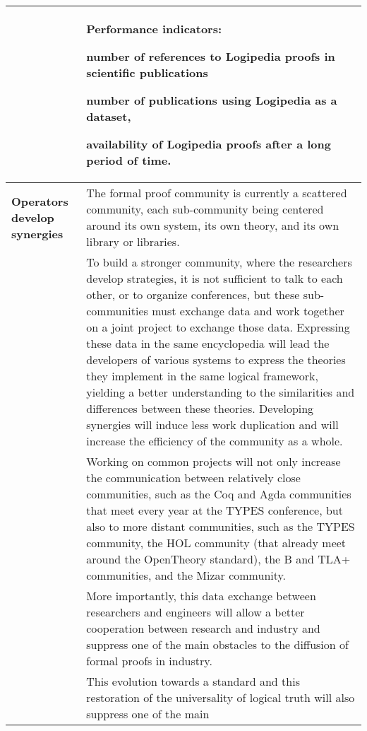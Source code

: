 \begin{longtable}{|p{}|p{}|}
\\
&
\colorbox{color3}{\bf Performance indicators:}
\begin{compactitem}
\item number of references to Logipedia proofs in scientific publications
\item number of publications using Logipedia as a dataset,
\item availability of Logipedia proofs after a long period of time.
\end{compactitem}
\\
\hline
{\bf Operators develop synergies}
&
The formal proof community is currently a scattered community, each
sub-community being centered around its own system, its own theory,
and its own library or libraries.\\
&
\hspace{0.4cm}
To build a stronger community, where the researchers develop
strategies, it is not sufficient to talk to each other, or to organize
conferences, but these sub-communities must exchange data and work
together on a joint project to exchange those data.  Expressing these
data in the same encyclopedia will lead the developers of various
systems to express the theories they implement in the same logical
framework, yielding a better understanding to the similarities and
differences between these theories.  Developing synergies will induce
less work duplication and will increase the efficiency of the
community as a whole.
\\
&
\hspace{0.4cm}
Working on common projects will not only increase the communication
between relatively close communities, such as the Coq and
  Agda communities that meet every year at the TYPES conference, but
also to more distant communities, such as the TYPES community, the HOL
community (that already meet around the OpenTheory standard),
the B and TLA+ communities, and the Mizar community.\\
&
\hspace{0.4cm}
More importantly, this data exchange between researchers and engineers
will allow a better cooperation between research and industry and
suppress one of the main obstacles to the diffusion of formal proofs
in industry.\\
&
\hspace{0.4cm}
This evolution towards a standard and this restoration of the
universality of logical truth will also suppress one of the main

\end{longtable}
